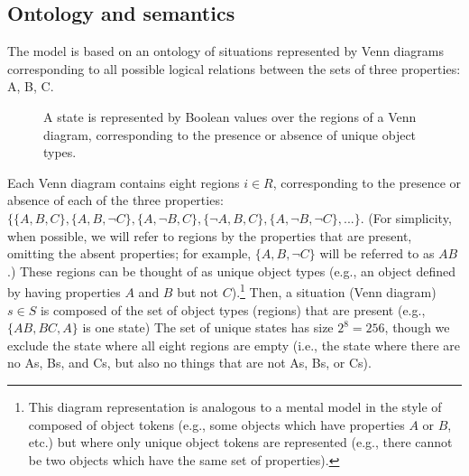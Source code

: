 \documentclass[floatsintext, doc]{apa6}
\begin{document}


\subsection{Ontology and semantics}

The model is based on an ontology of situations represented by Venn diagrams corresponding to all possible logical relations between the sets of three properties: A, B, C. 

\begin{figure}[h]
\centering
{}
\label{fig:venn}
\caption{A state is represented by Boolean values over the regions of a Venn diagram, corresponding to the presence or absence of unique object types.}
\end{figure}

Each Venn diagram contains eight regions $i \in R$, corresponding to the presence or absence of each of the three properties: $\{\{A,B,C\}, \{A,B,\neg C\}, \{A,\neg B,C\}, \{\neg A, B, C\}, \{A, \neg B, \neg C\},...\}$. (For simplicity, when possible, we will refer to regions by the properties that are present, omitting the absent properties; for example, $\{A, B, \neg C\}$ will be referred to as $AB$.)
These regions can be thought of as unique object types (e.g., an object defined by having properties $A$ and $B$ but not $C$).\footnote{This diagram representation is analogous to a mental model in the style of  composed of object tokens (e.g., some objects which have properties $A$ or $B$, etc.) but where only unique object tokens are represented (e.g., there cannot be two objects which have the same set of properties).}
Then, a situation (Venn diagram) $s \in S$ is composed of the set of object types (regions) that are present (e.g., $\{AB, BC, A\}$ is one state)
The set of unique states has size $2^8 = 256$, though we exclude the state where all eight regions are empty (i.e., the state where there are no As, Bs, and Cs, but also no things that are not As, Bs, or Cs).
\end{document}
